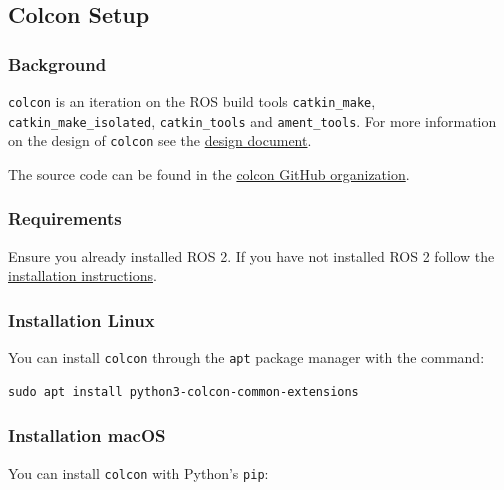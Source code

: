 
\subsection{Colcon Setup}
\label{sec:colcon-setup}

\subsubsection{Background}

\texttt{colcon} is an iteration on the ROS build tools \texttt{catkin\_make}, \texttt{catkin\_make\_isolated}, \texttt{catkin\_tools} and \texttt{ament\_tools}. For more information on the design of \texttt{colcon} see the \href{https://design.ros2.org/articles/build_tool.html}{design document}.

The source code can be found in the \href{https://github.com/colcon}{colcon GitHub organization}.

\subsubsection{Requirements}

Ensure you already installed ROS 2. If you have not installed ROS 2 follow the \href{https://docs.ros.org/en/humble/Installation.html}{installation instructions}.

\subsubsection{Installation Linux}

You can install \texttt{colcon} through the \texttt{apt} package manager with the command:

\begin{verbatim}
sudo apt install python3-colcon-common-extensions
\end{verbatim}

\subsubsection{Installation macOS}

You can install \texttt{colcon} with Python's \texttt{pip}:

